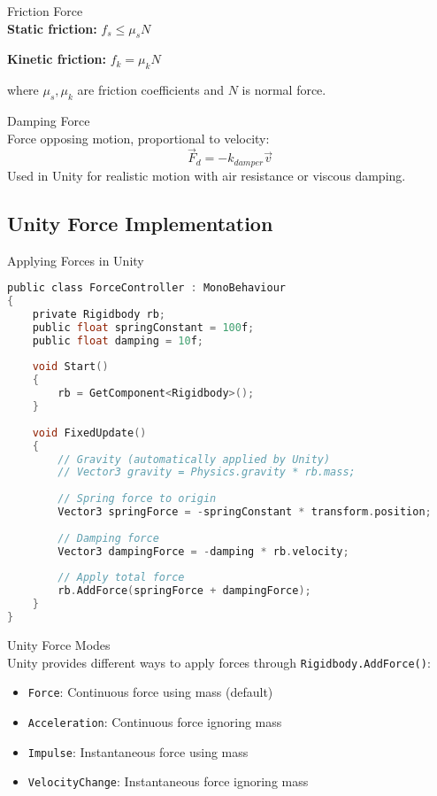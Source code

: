\begin{definition}{Friction Force}\\
    \textbf{Static friction:} $f_s \leq \mu_s N$
    
    \textbf{Kinetic friction:} $f_k = \mu_k N$
    
    where $\mu_s, \mu_k$ are friction coefficients and $N$ is normal force.
\end{definition}

\begin{definition}{Damping Force}\\
    Force opposing motion, proportional to velocity:
    $$\vec{F}_d = -k_{damper} \vec{v}$$
    Used in Unity for realistic motion with air resistance or viscous damping.
\end{definition}

\subsection{Unity Force Implementation}

\begin{code}{Applying Forces in Unity}\\
\begin{lstlisting}[language=C, style=basesmol]
public class ForceController : MonoBehaviour 
{
    private Rigidbody rb;
    public float springConstant = 100f;
    public float damping = 10f;
    
    void Start() 
    {
        rb = GetComponent<Rigidbody>();
    }
    
    void FixedUpdate() 
    {
        // Gravity (automatically applied by Unity)
        // Vector3 gravity = Physics.gravity * rb.mass;
        
        // Spring force to origin
        Vector3 springForce = -springConstant * transform.position;
        
        // Damping force
        Vector3 dampingForce = -damping * rb.velocity;
        
        // Apply total force
        rb.AddForce(springForce + dampingForce);
    }
}
\end{lstlisting}
\end{code}

\begin{concept}{Unity Force Modes}\\
    Unity provides different ways to apply forces through \texttt{Rigidbody.AddForce()}:
    \begin{itemize}
        \item \texttt{Force}: Continuous force using mass (default)
        \item \texttt{Acceleration}: Continuous force ignoring mass
        \item \texttt{Impulse}: Instantaneous force using mass
        \item \texttt{VelocityChange}: Instantaneous force ignoring mass
    \end{itemize}
\end{concept}

